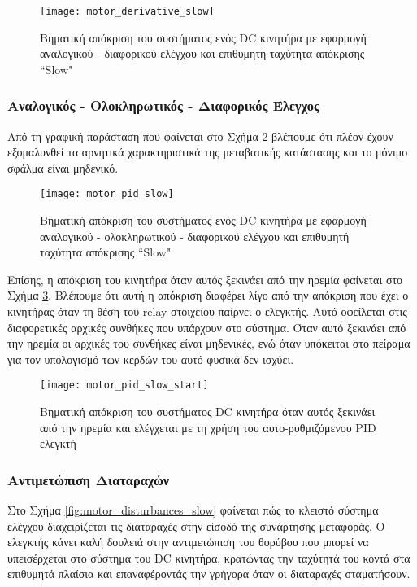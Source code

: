 \begin{figure}[h]
  \centering
  \texttt{[image: motor\_derivative\_slow]}
  \caption{Βηματική απόκριση του συστήματος ενός DC κινητήρα με εφαρμογή αναλογικού - διαφορικού ελέγχου και επιθυμητή ταχύτητα απόκρισης ``Slow"}
  \label{fig:motor_derivative_slow}
\end{figure}

\subsubsection{Αναλογικός - Ολοκληρωτικός - Διαφορικός Έλεγχος}

Από τη γραφική παράσταση που φαίνεται στο Σχήμα \ref{fig:motor_pid_slow} βλέπουμε ότι πλέον έχουν εξομαλυνθεί τα αρνητικά χαρακτηριστικά της μεταβατικής κατάστασης και το μόνιμο σφάλμα είναι μηδενικό.

\begin{figure}[h]
  \centering
  \texttt{[image: motor\_pid\_slow]}
  \caption{Βηματική απόκριση του συστήματος ενός DC κινητήρα με εφαρμογή αναλογικού - ολοκληρωτικού - διαφορικού ελέγχου και επιθυμητή ταχύτητα απόκρισης ``Slow"}
  \label{fig:motor_pid_slow}
\end{figure}

Επίσης, η απόκριση του κινητήρα όταν αυτός ξεκινάει από την ηρεμία φαίνεται στο Σχήμα \ref{fig:motor_pid_slow_start}. Βλέπουμε ότι αυτή η απόκριση διαφέρει λίγο από την απόκριση που έχει ο κινητήρας όταν τη θέση του relay στοιχείου παίρνει ο ελεγκτής. Αυτό οφείλεται στις διαφορετικές αρχικές συνθήκες που υπάρχουν στο σύστημα. Όταν αυτό ξεκινάει από την ηρεμία οι αρχικές του συνθήκες είναι μηδενικές, ενώ όταν υπόκειται στο πείραμα για τον υπολογισμό των κερδών του αυτό φυσικά δεν ισχύει.

\begin{figure}[h]
  \centering
  \texttt{[image: motor\_pid\_slow\_start]}
  \caption{Βηματική απόκριση του συστήματος DC κινητήρα όταν αυτός ξεκινάει από την ηρεμία και ελέγχεται με τη χρήση του αυτο-ρυθμιζόμενου PID ελεγκτή}
  \label{fig:motor_pid_slow_start}
\end{figure}

\subsubsection{Αντιμετώπιση Διαταραχών}

Στο Σχήμα \ref{fig:motor_disturbances_slow} φαίνεται πώς το κλειστό σύστημα ελέγχου διαχειρίζεται τις διαταραχές στην είσοδό της συνάρτησης μεταφοράς. Ο ελεγκτής κάνει καλή δουλειά στην αντιμετώπιση του θορύβου που μπορεί να υπεισέρχεται στο σύστημα του DC κινητήρα, κρατώντας την ταχύτητά του κοντά στα επιθυμητά πλαίσια και επαναφέροντάς την γρήγορα όταν οι διαταραχές σταματήσουν.


